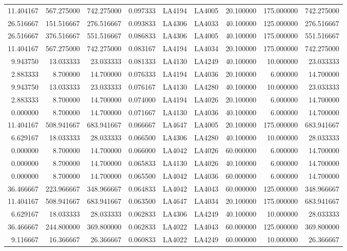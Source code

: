 \begin{tabular}{rrrrllrrr}
11.404167 & 567.275000 & 742.275000 & 0.097333 & LA4194 & LA4005 & 20.100000 & 175.000000 & 742.275000 \\
26.516667 & 151.516667 & 276.516667 & 0.093833 & LA4306 & LA4033 & 40.100000 & 125.000000 & 276.516667 \\
26.516667 & 376.516667 & 551.516667 & 0.086833 & LA4306 & LA4005 & 40.100000 & 175.000000 & 551.516667 \\
11.404167 & 567.275000 & 742.275000 & 0.083167 & LA4194 & LA4034 & 20.100000 & 175.000000 & 742.275000 \\
9.943750 & 13.033333 & 23.033333 & 0.081333 & LA4130 & LA4249 & 40.100000 & 10.000000 & 23.033333 \\
2.883333 & 8.700000 & 14.700000 & 0.076333 & LA4194 & LA4036 & 20.100000 & 6.000000 & 14.700000 \\
9.943750 & 13.033333 & 23.033333 & 0.076167 & LA4130 & LA4280 & 40.100000 & 10.000000 & 23.033333 \\
2.883333 & 8.700000 & 14.700000 & 0.074000 & LA4194 & LA4026 & 20.100000 & 6.000000 & 14.700000 \\
0.000000 & 8.700000 & 14.700000 & 0.071667 & LA4130 & LA4036 & 40.100000 & 6.000000 & 14.700000 \\
11.404167 & 508.941667 & 683.941667 & 0.066667 & LA4647 & LA4005 & 20.100000 & 175.000000 & 683.941667 \\
6.629167 & 18.033333 & 28.033333 & 0.066500 & LA4306 & LA4280 & 40.100000 & 10.000000 & 28.033333 \\
0.000000 & 8.700000 & 14.700000 & 0.066000 & LA4042 & LA4026 & 60.000000 & 6.000000 & 14.700000 \\
0.000000 & 8.700000 & 14.700000 & 0.065833 & LA4130 & LA4026 & 40.100000 & 6.000000 & 14.700000 \\
0.000000 & 8.700000 & 14.700000 & 0.065500 & LA4042 & LA4036 & 60.000000 & 6.000000 & 14.700000 \\
36.466667 & 223.966667 & 348.966667 & 0.064833 & LA4042 & LA4043 & 60.000000 & 125.000000 & 348.966667 \\
11.404167 & 508.941667 & 683.941667 & 0.063500 & LA4647 & LA4034 & 20.100000 & 175.000000 & 683.941667 \\
6.629167 & 18.033333 & 28.033333 & 0.062833 & LA4306 & LA4249 & 40.100000 & 10.000000 & 28.033333 \\
36.466667 & 244.800000 & 369.800000 & 0.062833 & LA4022 & LA4043 & 60.000000 & 125.000000 & 369.800000 \\
9.116667 & 16.366667 & 26.366667 & 0.060833 & LA4022 & LA4249 & 60.000000 & 10.000000 & 26.366667 \\

\end{tabular}
